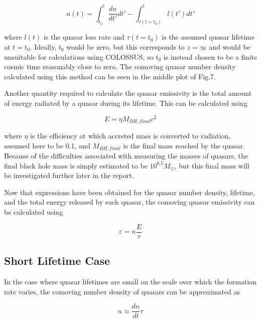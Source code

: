 \documentclass[12pt, twocolumn]{report}%
\begin{document}
\begin{equation}
    n(t)=\int_{t_0}^t\frac{dn}{dt'}dt'-\int_{\tau(t=t_0)}^tl(t')dt'
\end{equation}

\noindent where $l(t)$ is the quasar loss rate and $\tau(t=t_0)$ is the assumed quasar lifetime at $t=t_0$. Ideally, $t_0$ would be zero, but this corresponds to $z=\infty$ and would be unsuitable for calculations using COLOSSUS, so $t_0$ is instead chosen to be a finite cosmic time reasonably close to zero. The comoving quasar number density calculated using this method can be seen in the middle plot of Fig.7.\par

Another quantity required to calculate the quasar emissivity is the total amount of energy radiated by a quasar during its lifetime. This can be calculated using

\begin{equation}
    E=\eta M_{BH,final}c^2
\end{equation}

\noindent where $\eta$ is the efficiency at which accreted mass is converted to radiation, assumed here to be 0.1, and $M_{BH,final}$ is the final mass reached by the quasar. Because of the difficulties associated with measuring the masses of quasars, the final black hole mass is simply estimated to be $10^{8.5}M_\odot$, but this final mass will be investigated further later in the report.\par

Now that expressions have been obtained for the quasar number density, lifetime, and the total energy released by each quasar, the comoving quasar emissivity can be calculated using

\begin{equation}
    \varepsilon=n\frac{E}{\tau}
\end{equation}

\subsection{Short Lifetime Case}

In the case where quasar lifetimes are small on the scale over which the formation rate varies, the comoving number density of quasars can be approximated as

\begin{equation}
    n\approx\frac{dn}{dt}\tau
\end{equation}
\end{document}

